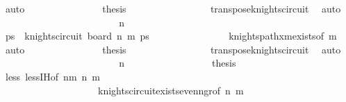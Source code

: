 \begin{isabellebody}
\ auto\isanewline
\ \ \ \ \ \ \ \ \ \ \ \ \isamarkupfalse%
\ \isamarkupfalse%
\ {\isacharquery}{\kern0pt}thesis\ \isanewline
\ \ \ \ \ \ \ \ \ \ \ \ \ \ \isamarkupfalse%
\ transpose{\isacharunderscore}{\kern0pt}knights{\isacharunderscore}{\kern0pt}circuit\ \isamarkupfalse%
\ auto\isanewline
\ \ \ \ \ \ \ \ \ \ \isamarkupfalse%
\isanewline
\ \ \ \ \ \ \ \ \ \ \ \ \isamarkupfalse%
\ {\isachardoublequoteopen}n{\isacharminus}{\kern0pt}{}\ {\isacharequal}{\kern0pt}\ {}{\isachardoublequoteclose}\isanewline
\ \ \ \ \ \ \ \ \ \ \ \ \isamarkupfalse%
\ \isamarkupfalse%
\ ps\ \ {\isachardoublequoteopen}knights{\isacharunderscore}{\kern0pt}circuit\ {\isacharparenleft}{\kern0pt}board\ {\isacharparenleft}{\kern0pt}n{\isacharminus}{\kern0pt}{}{\isacharparenright}{\kern0pt}\ m{\isacharparenright}{\kern0pt}\ ps{\isachardoublequoteclose}\isanewline
\ \ \ \ \ \ \ \ \ \ \ \ \ \ \isamarkupfalse%
\ knights{\isacharunderscore}{\kern0pt}path{\isacharunderscore}{\kern0pt}{}xm{\isacharunderscore}{\kern0pt}exists{\isacharbrackleft}{\kern0pt}of\ m{\isacharbrackright}{\kern0pt}\ \isamarkupfalse%
\ auto\isanewline
\ \ \ \ \ \ \ \ \ \ \ \ \isamarkupfalse%
\ \isamarkupfalse%
\ {\isacharquery}{\kern0pt}thesis\ \isanewline
\ \ \ \ \ \ \ \ \ \ \ \ \ \ \isamarkupfalse%
\ transpose{\isacharunderscore}{\kern0pt}knights{\isacharunderscore}{\kern0pt}circuit\ \isamarkupfalse%
\ auto\isanewline
\ \ \ \ \ \ \ \ \ \ \isamarkupfalse%
\isanewline
\ \ \ \ \ \ \ \ \ \ \ \ \isamarkupfalse%
\ {\isachardoublequoteopen}n{\isacharminus}{\kern0pt}{}\ {\isasymge}\ {}{}{\isachardoublequoteclose}\isanewline
\ \ \ \ \ \ \ \ \ \ \ \ \isamarkupfalse%
\ \isamarkupfalse%
\ {\isacharquery}{\kern0pt}thesis\ \isanewline
\ \ \ \ \ \ \ \ \ \ \ \ \ \ \isamarkupfalse%
\ less\ less{\isachardot}{\kern0pt}IH{\isacharbrackleft}{\kern0pt}of\ {\isachardoublequoteopen}n{\isacharminus}{\kern0pt}{}{}{\isacharplus}{\kern0pt}m{\isachardoublequoteclose}\ {\isachardoublequoteopen}n{\isacharminus}{\kern0pt}{}{}{\isachardoublequoteclose}\ m{\isacharbrackright}{\kern0pt}\isanewline
\ \ \ \ \ \ \ \ \ \ \ \ \ \ \ \ \ \ \ \ knights{\isacharunderscore}{\kern0pt}circuit{\isacharunderscore}{\kern0pt}exists{\isacharunderscore}{\kern0pt}even{\isacharunderscore}{\kern0pt}n{\isacharunderscore}{\kern0pt}gr{}{}{\isacharbrackleft}{\kern0pt}of\ {\isachardoublequoteopen}n{\isacharminus}{\kern0pt}{}{\isachardoublequoteclose}\ m{\isacharbrackright}{\kern0pt}\ \isamarkupfalse%

\end{isabellebody}
